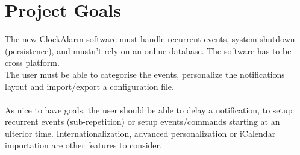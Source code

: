 \chapter{Project Goals}

The new ClockAlarm software must handle recurrent events, system shutdown (persistence), and mustn't rely on an online database. The software has to be cross platform.\\
The user must be able to categorise the events, personalize the notifications layout and import/export a configuration file.\\
\\
As nice to have goals, the user should be able to delay a notification, to setup recurrent events (sub-repetition) or setup events/commands starting at an ulterior time. Internationalization, advanced personalization or iCalendar importation are other features to consider.